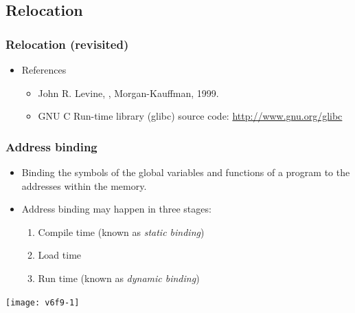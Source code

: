 \documentclass[CJKutf8,xcolor=pdftex,dvipsnames,table]{beamer}
\begin{document}
\begin{CJK*}{UTF8}{song}
  \subsection{Relocation}

  \begin{frame}
    \frametitle{Relocation (revisited)} \pause
    \begin{itemize}
    \item{References} \pause
      \begin{itemize}
      \item{John R. Levine, , Morgan-Kauffman, 1999.} \pause
      \item{GNU C Run-time library (glibc) source code: \url{http://www.gnu.org/glibc}}
      \end{itemize}
    \end{itemize}
  \end{frame}
  
  \begin{frame}
    \frametitle{Address binding} \pause
    \begin{minipage}[c]{0.6\textwidth}
      \begin{itemize}
      \item{Binding the symbols of the global variables and functions of a program to the addresses within the memory.} \pause
      \item{Address binding may happen in three stages:} \pause
        \begin{enumerate}
        \item{Compile time (known as \emph{static binding})} \pause
        \item{Load time} \pause
        \item{Run time (known as \emph{dynamic binding})} \pause
        \end{enumerate}
      \end{itemize}
    \end{minipage}%
    \begin{minipage}[c]{0.4\textwidth}
      \texttt{[image: v6f9-1]}
    \end{minipage}
  \end{frame}

  \iffalse


\end{CJK*}
\end{document}
